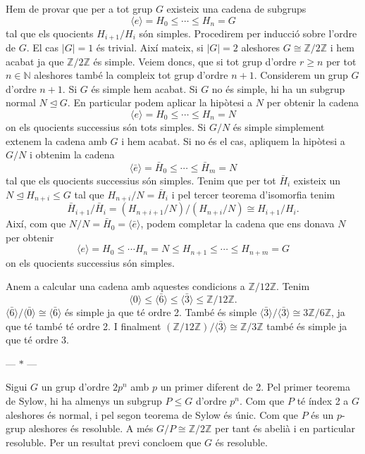 \documentclass[12pt]{article}
\newcommand{\Z}{\mathbb{Z}}
\newcommand{\N}{\mathbb{N}}
\newcommand{\gen}[1]{\langle #1 \rangle}
\newcommand{\abs}[1]{\left\lvert #1 \right\rvert}
\newcommand{\normal}{\trianglelefteq}
\newcommand{\parbreak}{
	\begin{center}
		--- $\ast$ ---
	\end{center} 
}
\begin{document}
Hem de provar que per a tot grup \( G \) existeix una cadena de subgrups 
\begin{equation*}
	\gen{e} = H_0 \leq \cdots \leq H_n = G
\end{equation*}
tal que els quocients \( H_{i+1}/H_i \) són simples. Procedirem per inducció sobre l'ordre de \( G \). El cas \( \abs{G} = 1 \) és trivial. Així mateix, si \( \abs{G} = 2 \) aleshores \( G \cong \Z/2\Z \) i hem acabat ja que \( \Z/2\Z \) és simple. Veiem doncs, que si tot grup d'ordre  \( r \geq n \) per tot \( n \in \N \) aleshores també la compleix tot grup d'ordre \( n+1 \). Considerem un grup \( G \) d'ordre \( n+1 \). Si \( G \) és simple hem acabat. Si \( G \) no és simple, hi ha un subgrup normal \( N \normal G \). En particular podem aplicar la hipòtesi a \( N \) per obtenir la cadena
\begin{equation*}
	\gen{e} = H_0 \leq \cdots \leq H_n = N
\end{equation*}
on els quocients successius són tots simples. Si \( G/N \) és simple simplement extenem la cadena amb \( G \) i hem acabat. Si no és el cas, apliquem la hipòtesi a \( G/N \) i obtenim la cadena
\begin{equation*}
\gen{\bar{e}} = \bar{H}_0 \leq \cdots \leq \bar{H}_{m} = N
\end{equation*}
tal que els quocients successius són simples. Tenim que per tot \( \bar{H}_i \) existeix un	\( N \normal H_{n+i} \leq G \) tal que \( H_{n+i}/N = \bar{H}_i \) i pel tercer teorema d'isomorfia tenim
\begin{equation*}
	\bar{H}_{i+1}/\bar{H}_i = (H_{n+i+1}/N) / (H_{n+i}/N) \cong H_{i+1}/H_i.
\end{equation*}
Així, com que \( N/N = \bar{H}_{0} = \gen{\bar{e}} \), podem completar la cadena que ens donava \( N \) per obtenir
\begin{equation*}
\gen{e} = H_0 \leq \cdots H_n = N \leq H_{n+1} \leq \cdots \leq H_{n+m} = G 
\end{equation*}
on els quocients successius són simples. 

Anem a calcular una cadena amb aquestes condicions a \( \Z/12\Z \). Tenim
\begin{equation*}
\gen{0} \leq \gen{\bar{6}} \leq \gen{\bar{3}} \leq \Z/12\Z. 
\end{equation*}
\( \gen{\bar{6}}/\gen{\bar{0}} \cong \gen{\bar{6}} \) és simple ja que té ordre 2. També és simple \( \gen{\bar{3}} / \gen{\bar{3}} \cong 3\Z/6\Z \), ja que té també té ordre 2. I finalment \( (\Z/12\Z)/\gen{\bar{3}} \cong \Z/3\Z \) també és simple ja que té ordre 3.

\parbreak

Sigui \( G \) un grup d'ordre \( 2p^n \) amb \( p \) un primer diferent de 2. Pel primer teorema de Sylow, hi ha almenys un subgrup \( P \leq G \) d'ordre \( p^n \). Com que \( P \) té índex 2 a \( G \) aleshores és normal, i pel segon teorema de Sylow és únic. Com que \( P \) és un \( p \)-grup aleshores és resoluble. A més \( G/P \cong \Z/2\Z \) per tant és abelià i en particular resoluble. Per un resultat previ concloem que \( G \) és resoluble. 
\end{document}
